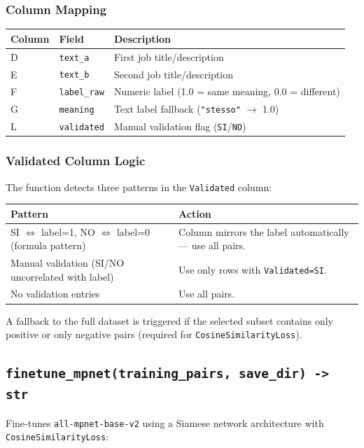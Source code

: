 ﻿\documentclass[12pt,a4paper]{article}
\begin{document}
\subsubsection*{Column Mapping}
\begin{longtable}{@{}P{2cm}P{3.5cm}P{9cm}@{}}
\toprule
\textbf{Column} & \textbf{Field} & \textbf{Description} \\
\midrule
\endhead
D & \texttt{text\_a} & First job title/description \\
E & \texttt{text\_b} & Second job title/description \\
F & \texttt{label\_raw} & Numeric label (1.0 = same meaning, 0.0 = different) \\
G & \texttt{meaning} & Text label fallback (\texttt{"stesso"} $\to$ 1.0) \\
L & \texttt{validated} & Manual validation flag (\texttt{SI}/\texttt{NO}) \\
\bottomrule
\end{longtable}

\subsubsection*{Validated Column Logic}

The function detects three patterns in the \texttt{Validated} column:

\begin{longtable}{@{}P{5cm}P{9.5cm}@{}}
\toprule
\textbf{Pattern} & \textbf{Action} \\
\midrule
\endhead
SI $\Leftrightarrow$ label=1, NO $\Leftrightarrow$ label=0 (formula pattern) &
  Column mirrors the label automatically --- use all pairs. \\
Manual validation (SI/NO uncorrelated with label) &
  Use only rows with \texttt{Validated=SI}. \\
No validation entries &
  Use all pairs. \\
\bottomrule
\end{longtable}

A fallback to the full dataset is triggered if the selected subset contains only positive or only negative pairs (required for \texttt{CosineSimilarityLoss}).

\subsection{\texttt{finetune\_mpnet(training\_pairs, save\_dir) -> str}}

Fine-tunes \texttt{all-mpnet-base-v2} using a Siamese network architecture with \texttt{CosineSimilarityLoss}:
\end{document}
